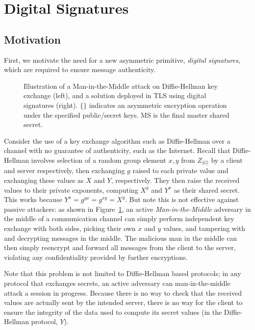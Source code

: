 \section{Digital Signatures}
\label{sec:pke}

\subsection{Motivation}

First, we motivate the need for a new asymmetric primitive, \emph{digital signatures}, which are required to ensure message authenticity.


\begin{figure}[h]
\centering
\scalebox{0.8}{}
  \caption{Illustration of a Man-in-the-Middle attack on Diffie-Hellman key exchange (left), and a solution deployed in TLS using digital signatures (right).  $\{\}$ indicates an asymmetric encryption operation under the specified public/secret keys.  MS is the final master shared secret.}
\label{fig:mitmdiffie}
\end{figure}

Consider the use of a key exchange algorithm such as Diffie-Hellman over a channel with no guarantee of authenticity, such as the Internet. Recall that Diffie-Hellman involves selection of a random group element $x, y$ from ${Z}_{|G|}$ by a client and server respectively, then exchanging $g$ raised to each private value and exchanging these values as $X$ and $Y$, respectively.  They then raise the received values to their private exponents, computing $X^y$ and $Y^x$ as their shared secret. This works because $Y^x=g^{yx}=g^{xy}=X^y$. But note this is not effective against passive attackers: as shown in Figure~\ref{fig:mitmdiffie}, an active \emph{Man-in-the-Middle} adversary in the middle of a communication channel can simply perform independent key exchange with both sides, picking their own $x$ and $y$ values, and tampering with and decrypting messages in the middle. The malicious man in the middle can then simply reencrypt and forward all messages from the client to the server, violating any confidentiality provided by further encryptions.

Note that this problem is not limited to Diffie-Hellman based protocols; in any protocol that exchanges secrets, an active adversary can man-in-the-middle attack a session in progress.  Because there is no way to check that the received values are actually sent by the intended server, there is no way for the client to ensure the integrity of the data used to compute its secret values (in the Diffie-Hellman protocol, $Y$).

